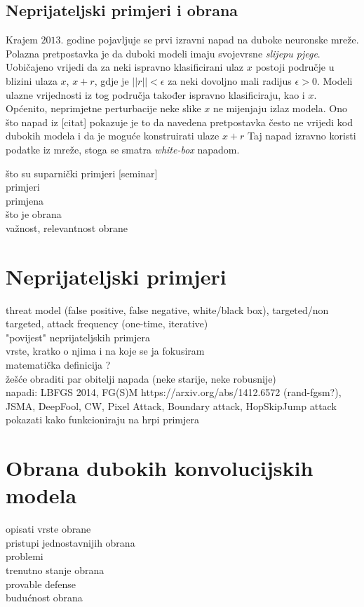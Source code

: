 \documentclass[utf8, diplomski]{fer}
\begin{document}
\section{Neprijateljski primjeri i obrana}
Krajem $2013.$ godine pojavljuje se prvi izravni napad na duboke neuronske mreže. Polazna pretpostavka je da duboki modeli imaju svojevrsne \textit{slijepu pjege}. \\
Uobičajeno vrijedi da za neki ispravno klasificirani ulaz $x$ postoji područje u blizini ulaza $x$, $x + r$, gdje je $||r|| < \epsilon$ za neki dovoljno mali radijus $\epsilon > 0$. Modeli ulazne vrijednosti iz tog područja također ispravno klasificiraju, kao i $x$. Općenito, neprimjetne perturbacije neke slike $x$ ne mijenjaju izlaz modela. Ono što napad iz [citat] pokazuje je to da navedena pretpostavka često ne vrijedi kod dubokih modela i da je moguće konstruirati ulaze $x + r$  Taj napad izravno koristi podatke iz mreže, stoga se smatra \textit{white-box} napadom. 

što su suparnički primjeri [seminar]\\
primjeri \\
primjena \\
što je obrana \\
važnost, relevantnost obrane \\

\chapter{Neprijateljski primjeri}
threat model (false positive, false negative, white/black box), targeted/non targeted, attack frequency (one-time, iterative) \\
"povijest" neprijateljskih primjera \\
vrste, kratko o njima i na koje se ja fokusiram \\
matematička definicija ? \\
žešće obraditi par obitelji napada (neke starije, neke robusnije) \\
napadi: LBFGS 2014, FG(S)M https://arxiv.org/abs/1412.6572 (rand-fgsm?), JSMA, DeepFool, CW, Pixel Attack, Boundary attack, HopSkipJump attack \\
pokazati kako funkcioniraju na hrpi primjera

\chapter{Obrana dubokih konvolucijskih modela}
opisati vrste obrane \\
pristupi jednostavnijih obrana \\
problemi \\
trenutno stanje obrana \\
provable defense \\
budućnost obrana 
\end{document}
